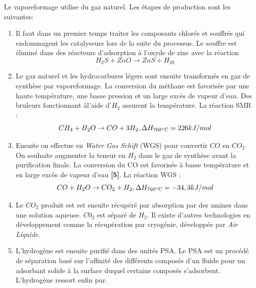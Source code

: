 \documentclass[11pt,french,a4paper]{article}
\begin{document}
Le vaporeformage utilise du gaz naturel. Les étapes de production sont les suivantes:
\begin{enumerate}
\item Il faut dans un premier temps traiter les composants chlorés et souffrés qui endommagent les catalyseurs lors de la suite du processus. Le souffre est éliminé dans des réacteurs d’adsorption à l’oxyde de zinc \cite{Prod_gaz_synth}
 avec la réaction $$ H_2S + ZnO \rightarrow ZnS + H_20 $$ 

\item Le gaz naturel et les hydrocarbures légers sont ensuite transformés en gaz de synthèse par vaporeformage. La conversion du méthane est favorisée par une haute température, une basse pression et un large excès de vapeur d’eau. Des bruleurs fonctionnant àl'aide d'$H_2$ assurent la température. La réaction SMR : $$ CH_4 + H_2O \rightarrow CO + 3H_2 , \Delta H_{760\celsius}=226kJ/mol$$

\item Ensuite on effectue en \emph{Water Gas Schift} (WGS) pour convertir $CO$ en $CO_2$. On souhaite augmenter la teneur en $H_2$ dans le gaz de synthèse avant la purification finale. La conversion du CO est favorisée à basse température et en large excès de vapeur d’eau \textbf{[5]}. La réaction WGS : $$ CO + H_2O \rightarrow CO_2 + H_2 , \Delta H_{760\celsius} =-34,3kJ/mol$$

\item Le $CO_2$ produit est est ensuite récupéré par absorption par des amines dans une solution aqueuse. $C0_2$ est séparé de $H_2$. Il existe d'autres technologies en développement comme la récupération par cryogénie, développée par \emph{Air Liquide}.

\item L'hydrogène est ensuite purifié dans des unités PSA. Le PSA est un procédé de séparation basé sur l’affinité des différents composés d’un fluide pour un adsorbant solide à la surface duquel certains composés s’adsorbent. L'hydrogène ressort enfin pur. \\

\end{enumerate}
\end{document}
